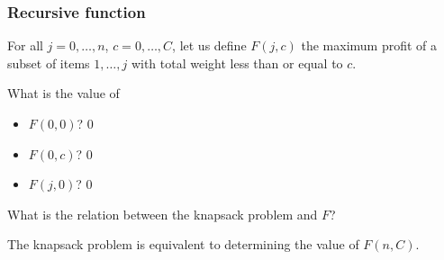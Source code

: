 \documentclass{beamer}
\begin{document}
\begin{frame}
  \frametitle{Recursive function}

  For all $j = 0, \dots, n$, $c = 0, \dots, C$, let us define \alert{$F(j, c)$} the maximum profit of a subset of items $1, \dots, j$ with total weight less than or equal to $c$.

  \bigskip

  \pause
  What is the value of
  \begin{itemize}
    \item $F(0, 0)$? \pause $0$ \pause
    \item $F(0, c)$? \pause $0$ \pause
    \item $F(j, 0)$? \pause $0$ \pause
  \end{itemize}

  \bigskip

  What is the relation between the knapsack problem and $F$? \pause

  The knapsack problem is equivalent to determining the value of $F(n, C)$.
\end{frame}
\end{document}
